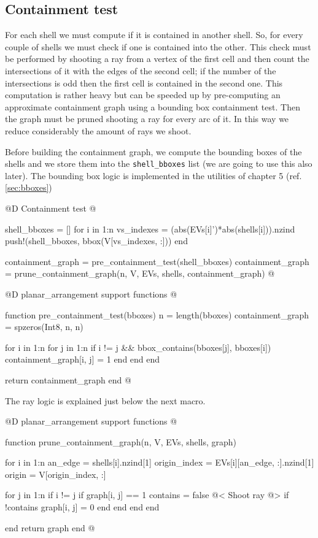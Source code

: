 \documentclass[10pt]{book}
\begin{document}
\subsection{Containment test}

For each shell we must compute if it is contained
in another shell. So, for every couple of shells
we must check if one is contained into the other.
This check must be performed by shooting a ray from
a vertex of the first cell and then count the intersections
of it with the edges of the second cell; if the number 
of the intersections is odd then the first cell is contained
in the second one. This computation is rather heavy but can be
speeded up by pre-computing an approximate containment graph 
using a bounding box containment test. Then the graph must be
pruned shooting a ray for every arc of it. In this way we reduce
considerably the amount of rays we shoot.

Before building the containment graph, we
compute the bounding boxes of the shells and we store them into
the \texttt{shell\_bboxes} list (we are going to use this also later).
The bounding box logic is implemented in the utilities of chapter 5 
(ref. \ref{sec:bboxes})

@D Containment test
@{shell_bboxes = []
for i in 1:n
    vs_indexes = (abs(EVs[i]')*abs(shells[i])).nzind
    push!(shell_bboxes, bbox(V[vs_indexes, :]))
end

containment_graph = pre_containment_test(shell_bboxes)
containment_graph = prune_containment_graph(n, V, EVs, shells, containment_graph)
@}

@D planar\_arrangement support functions
@{function pre_containment_test(bboxes)
    n = length(bboxes)
    containment_graph = spzeros(Int8, n, n)

    for i in 1:n
        for j in 1:n
            if i != j && bbox_contains(bboxes[j], bboxes[i])
                containment_graph[i, j] = 1
            end
        end
    end

    return containment_graph
end
@}

The ray logic is explained just below the next macro.

@D planar\_arrangement support functions
@{function prune_containment_graph(n, V, EVs, shells, graph)
    
    for i in 1:n
        an_edge = shells[i].nzind[1]
        origin_index = EVs[i][an_edge, :].nzind[1]
        origin = V[origin_index, :]
 
        for j in 1:n
            if i != j
                if graph[i, j] == 1
                    contains = false
                    @< Shoot ray @>
                    if !contains
                        graph[i, j] = 0
                    end
                end
             end
         end

     end
     return graph
end
@}
\end{document}
